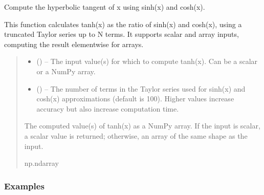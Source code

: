 \documentclass[a4paper,10pt,oneside,english]{sphinxmanual}
\begin{document}
\begin{fulllineitems}
\label{\detokenize{acsefunctions:acsefunctions.functions.tanh}}
\pysigstartsignatures
\pysiglinewithargsret
{}
{\sphinxparamcomma {}}
{}
\pysigstopsignatures
\sphinxAtStartPar
Compute the hyperbolic tangent of x using sinh(x) and cosh(x).

\sphinxAtStartPar
This function calculates tanh(x) as the ratio of sinh(x) and cosh(x), using
a truncated Taylor series up to N terms.
It supports scalar and array inputs,
computing the result element\sphinxhyphen{}wise for arrays.
\begin{quote}\begin{description}
\begin{itemize}
\item {} 
\sphinxAtStartPar
{} () – The input value(s) for which to compute tanh(x). Can be a scalar or a
NumPy array.

\item {} 
\sphinxAtStartPar
{} (\sphinxstyleliteralemphasis{\sphinxupquote{, }}) – The number of terms in the Taylor series used for sinh(x) and cosh(x)
approximations (default is 100). Higher values increase accuracy but
also increase computation time.

\end{itemize}

\sphinxAtStartPar
The computed value(s) of tanh(x) as a NumPy array. If the input
is scalar,
a scalar value is returned; otherwise, an array of the same shape as
the input.

\sphinxAtStartPar
np.ndarray

\end{description}\end{quote}
\subsubsection*{Examples}


\end{fulllineitems}
\end{document}
